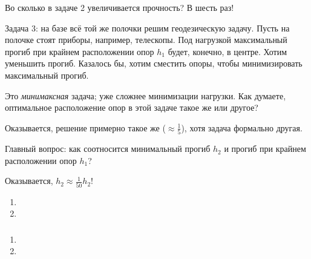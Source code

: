 \documentclass[main.tex]{subfiles}
\begin{document}
Во сколько в задаче 2 увеличивается прочность? В шесть раз!

Задача 3: на базе всё той же полочки решим геодезическую задачу.
Пусть на полочке стоят приборы, например, телескопы.
Под нагрузкой максимальный прогиб при крайнем расположении опор $ h_1 $ будет, конечно, в центре.
Хотим уменьшить прогиб.
Казалось бы, хотим сместить опоры, чтобы минимизировать максимальный прогиб.

Это \emph{минимаксная} задача; уже сложнее минимизации нагрузки.
Как думаете, оптимальное расположение опор в этой задаче такое же или другое?

Оказывается, решение примерно такое же ($ \approx \frac{1}{5} $), хотя задача формально другая.

Главный вопрос: как соотносится минимальный прогиб $h_2$ и прогиб при крайнем расположении опор $ h_1 $?

Оказывается, $ h_2 \approx \frac{1}{50} h_2 $!



\begin{enumerate}[noitemsep]
	\item 
	\item
\end{enumerate}

\subsubsection{}

\begin{enumerate}[noitemsep]
	\item
	\item
\end{enumerate}
\end{document}
